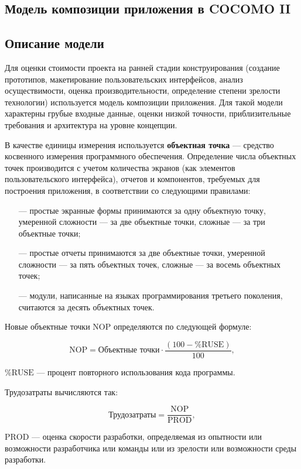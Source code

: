 \subsection*{Модель композиции приложения в COCOMO II}

\subsection*{Описание модели}

Для оценки стоимости проекта на ранней стадии конструирования (создание прототипов, макетирование пользовательских интерфейсов, анализ осуществимости, оценка производительности, определение степени зрелости технологии) используется модель композиции приложения. Для такой модели характерны грубые входные данные, оценки низкой точности, приблизительные требования и архитектура на уровне концепции.

В качестве единицы измерения используется \textbf{объектная точка} --- средство косвенного измерения программного обеспечения. Определение числа
объектных точек производится с учетом количества экранов (как элементов
пользовательского интерфейса), отчетов и компонентов, требуемых для построения приложения, в соответствии со следующими правилами:

\begin{itemize}
    \item[---] простые экранные формы принимаются за одну объектную точку,
умеренной сложности — за две объектные точки, сложные — за три
объектные точки;
    \item[---] простые отчеты принимаются за две объектные точки, умеренной
сложности --- за пять объектных точек, сложные --- за восемь объектных
точек;
    \item[---] модули, написанные на языках программирования третьего поколения,
считаются за десять объектных точек.
\end{itemize}

Новые объектные точки NOP определяются по следующей формуле:

$$\text{NOP} = \text{Объектные точки} \cdot \frac{(100 - \%\text{RUSE})}{100},$$

 \%$\text{RUSE}$ --- процент повторного использования кода программы.

Трудозатраты вычисляются так:

$$\text{Трудозатраты} = \frac{\text{NOP}}{\text{PROD}},$$

 $\text{PROD}$ --- оценка скорости разработки, определяемая из опытности или возможности разработчика или команды или из зрелости или возможности среды разработки.

